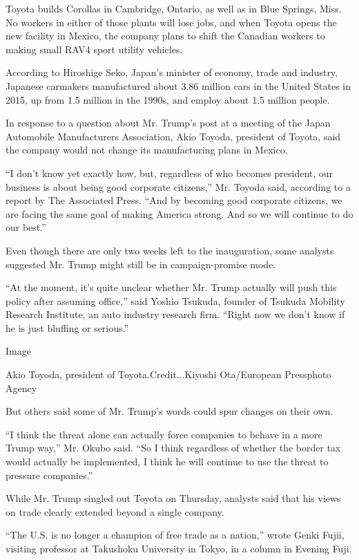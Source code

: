Toyota builds Corollas in Cambridge, Ontario, as well as in Blue
Springs, Miss. No workers in either of those plants will lose jobs, and
when Toyota opens the new facility in Mexico, the company plans to shift
the Canadian workers to making small RAV4 sport utility vehicles.

According to Hiroshige Seko, Japan's minister of economy, trade and
industry, Japanese carmakers manufactured about 3.86 million cars in the
United States in 2015, up from 1.5 million in the 1990s, and employ
about 1.5 million people.

In response to a question about Mr. Trump's post at a meeting of the
Japan Automobile Manufacturers Association, Akio Toyoda, president of
Toyota, said the company would not change its manufacturing plans in
Mexico.

``I don't know yet exactly how, but, regardless of who becomes
president, our business is about being good corporate citizens,'' Mr.
Toyoda said, according to a report by The Associated Press. ``And by
becoming good corporate citizens, we are facing the same goal of making
America strong. And so we will continue to do our best.''

Even though there are only two weeks left to the inauguration, some
analysts suggested Mr. Trump might still be in campaign-promise mode.

``At the moment, it's quite unclear whether Mr. Trump actually will push
this policy after assuming office,'' said Yoshio Tsukuda, founder of
Tsukuda Mobility Research Institute, an auto industry research firm.
``Right now we don't know if he is just bluffing or serious.''

Image

Akio Toyoda, president of Toyota.Credit...Kiyoshi Ota/European
Pressphoto Agency

But others said some of Mr. Trump's words could spur changes on their
own.

``I think the threat alone can actually force companies to behave in a
more Trump way,'' Mr. Okubo said. ``So I think regardless of whether the
border tax would actually be implemented, I think he will continue to
use the threat to pressure companies.''

While Mr. Trump singled out Toyota on Thursday, analysts said that his
views on trade clearly extended beyond a single company.

``The U.S. is no longer a champion of free trade as a nation,'' wrote
Genki Fujii, visiting professor at Takushoku University in Tokyo, in a
column in Evening Fuji.

